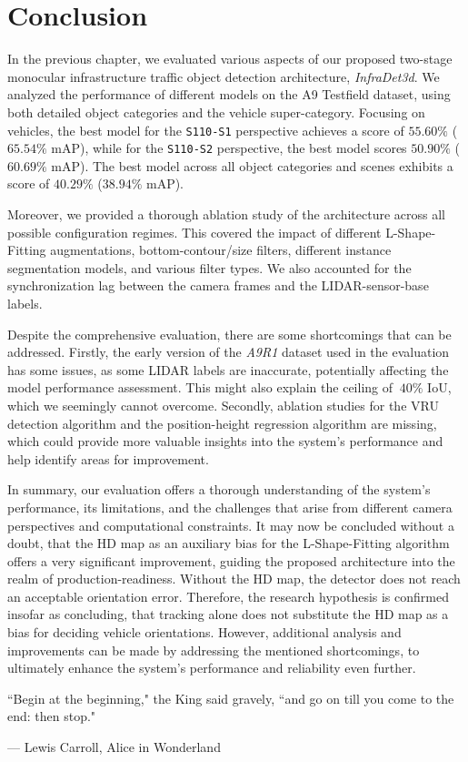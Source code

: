 
\chapter{Conclusion}
\label{ch:conclusion}

In the previous chapter, we evaluated various aspects of our proposed two-stage monocular infrastructure traffic object detection architecture, \textit{InfraDet3d}.
We analyzed the performance of different models on the A9 Testfield dataset, using both detailed object categories and the vehicle super-category.
Focusing on vehicles, the best model for the \texttt{S110-S1} perspective achieves a score of $55.60\%$ ($65.54\%$ mAP), while for the \texttt{S110-S2} perspective, the best model scores $50.90\%$ ($60.69\%$ mAP).
The best model across all object categories and scenes exhibits a score of $40.29\%$ ($38.94\%$ mAP).

Moreover, we provided a thorough ablation study of the architecture across all possible configuration regimes.
This covered the impact of different L-Shape-Fitting augmentations, bottom-contour/size filters, different instance segmentation models, and various filter types.
We also accounted for the synchronization lag between the camera frames and the LIDAR-sensor-base labels.

Despite the comprehensive evaluation, there are some shortcomings that can be addressed.
Firstly, the early version of the \textit{A9R1} dataset used in the evaluation has some issues, as some LIDAR labels are inaccurate, potentially affecting the model performance assessment.
This might also explain the ceiling of $~40\%$ IoU, which we seemingly cannot overcome.
Secondly, ablation studies for the VRU detection algorithm and the position-height regression algorithm are missing, which could provide more valuable insights into the system's performance and help identify areas for improvement.

In summary, our evaluation offers a thorough understanding of the system's performance, its limitations, and the challenges that arise from different camera perspectives and computational constraints.
It may now be concluded without a doubt, that the HD map as an auxiliary bias for the L-Shape-Fitting algorithm offers a very significant improvement, guiding the proposed architecture into the realm of production-readiness.
Without the HD map, the detector does not reach an acceptable orientation error.
Therefore, the research hypothesis is confirmed insofar as concluding, that tracking alone does not substitute the HD map as a bias for deciding vehicle orientations.
However, additional analysis and improvements can be made by addressing the mentioned shortcomings, to ultimately enhance the system's performance and reliability even further.

\par\vspace*{\fill}
\epigraph{``Begin at the beginning," the King said gravely, ``and go on till you come to the end: then stop."}{--- \textup{Lewis Carroll}, Alice in Wonderland}
